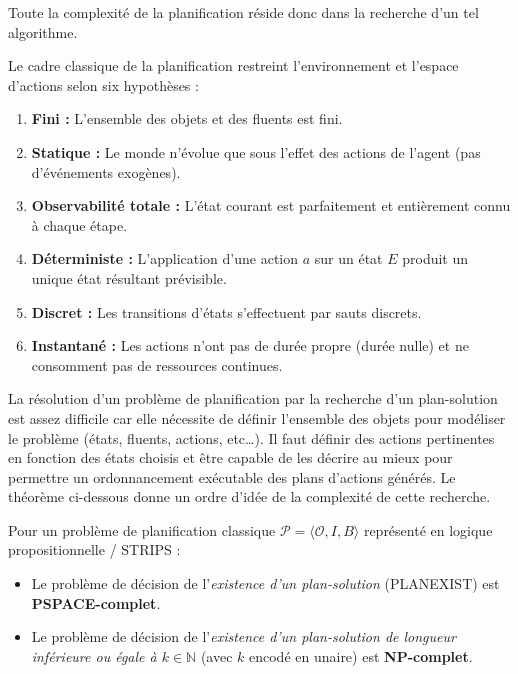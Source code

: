 Toute la complexité de la planification réside donc dans la recherche d'un tel algorithme. 

\begin{proposition}
    Le cadre classique de la planification restreint l'environnement et l'espace d'actions selon six hypothèses :
    \begin{enumerate}
        \item \textbf{Fini :} L'ensemble des objets et des fluents est fini.
        \item \textbf{Statique :} Le monde n'évolue que sous l'effet des actions de l'agent (pas d'événements exogènes).
        \item \textbf{Observabilité totale :} L'état courant est parfaitement et entièrement connu à chaque étape.
        \item \textbf{Déterministe :} L'application d'une action $a$ sur un état $E$ produit un unique état résultant prévisible.
        \item \textbf{Discret :} Les transitions d'états s'effectuent par sauts discrets.
        \item \textbf{Instantané :} Les actions n'ont pas de durée propre (durée nulle) et ne consomment pas de ressources continues.
    \end{enumerate}
\end{proposition}

La résolution d'un problème de planification par la recherche d'un plan-solution est assez difficile car elle nécessite de définir l'ensemble des objets pour modéliser le problème (états, fluents, actions, etc\dots). Il faut définir des actions pertinentes en fonction des états choisis et être capable de les décrire au mieux pour permettre un ordonnancement exécutable des plans d'actions générés. 
Le théorème ci-dessous donne un ordre d'idée de la complexité de cette recherche. 

\begin{theorem}
    Pour un problème de planification classique $\mathcal{P} = \langle \mathcal{O}, I, B \rangle$ représenté en logique propositionnelle / STRIPS :
    \begin{itemize}
        \item Le problème de décision de l'\emph{existence d'un plan-solution} (PLANEXIST) est \textbf{PSPACE-complet}.
        \item Le problème de décision de l'\emph{existence d'un plan-solution de longueur inférieure ou égale à $k \in \mathbb{N}$} (avec $k$ encodé en unaire) est \textbf{NP-complet}.
    \end{itemize}
\end{theorem}

